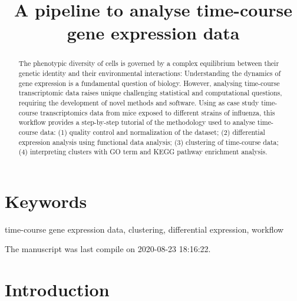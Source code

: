 \documentclass[9pt,a4paper,]{extarticle}
\begin{document}
\pagestyle{front}

\title{A pipeline to analyse time-course gene expression data}


\maketitle
\thispagestyle{front}

\begin{abstract}
The phenotypic diversity of cells is governed by a complex equilibrium between their genetic identity and their environmental interactions: Understanding the dynamics of gene expression is a fundamental question of biology. However, analysing time-course transcriptomic data raises unique challenging statistical and computational questions, requiring the development of novel methods and software. Using as case study time-course transcriptomics data from mice exposed to different strains of influenza, this workflow provides a step-by-step tutorial of the methodology used to analyse time-course data: (1) quality control and normalization of the dataset; (2) differential expression analysis using functional data analysis; (3) clustering of time-course data; (4) interpreting clusters with GO term and KEGG pathway enrichment analysis.
\end{abstract}

\section*{Keywords}
time-course gene expression data, clustering, differential expression, workflow


\clearpage
\pagestyle{main}

The manuscript was last compile on 2020-08-23 18:16:22.

\hypertarget{introduction}{%
\section{Introduction}\label{introduction}}
\end{document}
